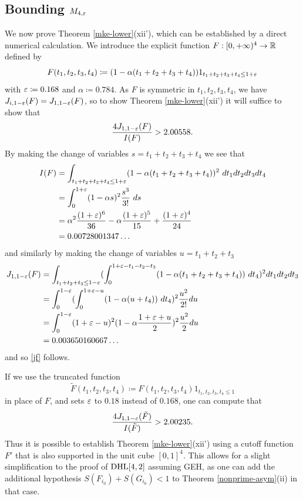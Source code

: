 \subsection{Bounding \texorpdfstring{$M_{4,\varepsilon}$}{M4,0.18}}\label{4d}

We now prove Theorem \ref{mke-lower}(xii'), which can be established by a direct numerical calculation.  We introduce the explicit function $F: [0,+\infty)^4 \to \mathbb{R}$ defined by
$$ F(t_1,t_2,t_3,t_4) \coloneqq (1 - \alpha (t_1+t_2+t_3+t_4)) 1_{t_1+t_2+t_3+t_4 \leq 1+\varepsilon}$$
with $\varepsilon \coloneqq 0.168$ and $\alpha \coloneqq 0.784$.  As $F$ is symmetric in $t_1,t_2,t_3,t_4$, we have $J_{i,1-\varepsilon}(F) = J_{1,1-\varepsilon}(F)$, so to show Theorem \ref{mke-lower}(xii') it will suffice to show that
\begin{equation}\label{jf}
 \frac{4 J_{1,1-\varepsilon}(F)}{I(F)} > 2.00558.
\end{equation}
By making the change of variables $s=t_1+t_2+t_3+t_4$ we see that
\begin{align*}
I(F) &= \int_{t_1+t_2+t_3+t_4 \leq 1+\varepsilon} (1-\alpha(t_1+t_2+t_3+t_4))^2\ dt_1 dt_2 dt_3 dt_4 \\
&= \int_0^{1+\varepsilon} (1-\alpha s)^2 \frac{s^3}{3!}\ ds\\
&= \alpha^2 \frac{(1+\varepsilon)^6}{36} - \alpha \frac{(1+\varepsilon)^5}{15} + \frac{(1+\varepsilon)^4}{24} \\
&= 0.00728001347\dots
\end{align*}
and similarly by making the change of variables $u = t_1+t_2+t_3$
\begin{align*}
J_{1,1-\varepsilon}(F) &= \int_{t_1+t_2+t_3 \leq 1-\varepsilon} (\int_0^{1+\varepsilon-t_1-t_2-t_3} (1-\alpha(t_1+t_2+t_3+t_4))\ dt_4)^2 dt_1 dt_2 dt_3 \\
&= \int_0^{1-\varepsilon} (\int_0^{1+\varepsilon-u} (1-\alpha(u+t_4))\ dt_4)^2 \frac{u^2}{2!} du \\
&= \int_0^{1-\varepsilon} (1+\varepsilon-u)^2 (1-\alpha \frac{1+\varepsilon+u}{2})^2 \frac{u^2}{2} du  \\
&= 0.003650160667\dots
\end{align*}
and so \eqref{jf} follows.

\begin{remark}  If we use the truncated function
$$ \tilde F(t_1,t_2,t_3,t_4) \coloneqq F(t_1,t_2,t_3,t_4) 1_{t_1,t_2,t_3,t_4 \leq 1}$$
in place of $F$, and sets $\varepsilon$ to $0.18$ instead of $0.168$, one can compute that
$$ \frac{4 J_{1,1-\varepsilon}(\tilde F)}{I(\tilde F)} > 2.00235.$$
Thus it is possible to establish Theorem \ref{mke-lower}(xii') using a cutoff function $F'$ that is also supported in the unit cube $[0,1]^4$.  This allows for a slight simplification to the proof of $\operatorname*{DHL}[4,2]$ assuming GEH, as one can add the additional hypothesis $S(F_{i_0})+S(G_{i_0}) < 1$ to Theorem \ref{nonprime-asym}(ii) in that case.
\end{remark}

